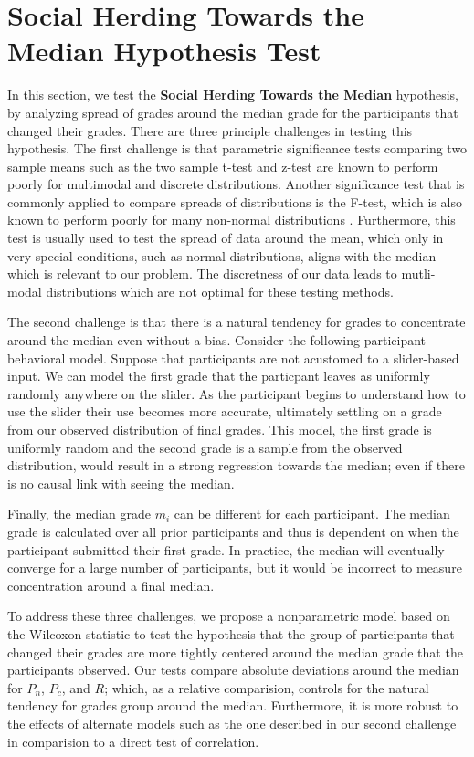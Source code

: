 \section{Social Herding Towards the Median Hypothesis Test}\label{ht}
In this section, we test the \textbf{Social Herding Towards the Median} hypothesis, by analyzing spread of grades around the median grade for the participants that changed their grades.
There are three principle challenges in testing this hypothesis.
The first challenge is that parametric significance tests comparing two sample means such as the two sample t-test and z-test are known to 
perform poorly for multimodal and discrete distributions.
Another significance test that is commonly applied to compare spreads of distributions is the F-test, which is also known to perform poorly for many non-normal distributions \cite{markowski1990conditions}.
Furthermore, this test is usually used to test the spread of data around the mean, which only in very special conditions, such as normal distributions, aligns with the median which is relevant to our problem. 
The discretness of our data leads to mutli-modal distributions which are not optimal for these testing methods.

The second challenge is that there is a natural tendency for grades to concentrate around the median even without a bias.
Consider the following participant behavioral model.
Suppose that participants are not acustomed to a slider-based input.
We can model the first grade that the particpant leaves as uniformly randomly anywhere on the slider.
As the participant begins to understand how to use the slider their use becomes more accurate, ultimately settling on a grade from our observed distribution of final grades.
This model, the first grade is uniformly random and the second grade is a sample from the observed distribution, would result in a strong regression towards the median; even if there is no causal link with seeing the median.

Finally, the median grade $m_i$ can be different for each participant.
The median grade is calculated over all prior participants and thus is dependent on when the participant submitted their first grade.
In practice, the median will eventually converge for a large number of participants, but it would be incorrect to measure concentration around a final median.

To address these three challenges, we propose a nonparametric model based on the Wilcoxon statistic to test the hypothesis that the group of participants that changed their grades are more tightly centered around the median grade that the participants observed.
Our tests compare absolute deviations around the median for $P_n$, $P_c$, and $R$; which, as a relative comparision, controls for the natural tendency for grades group around the median.
Furthermore, it is more robust to the effects of alternate models such as the one described in our second challenge in comparision to a direct test of correlation.


